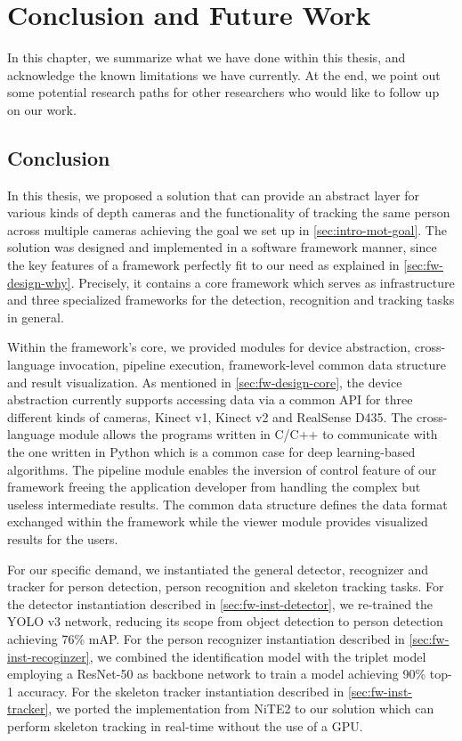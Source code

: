 \chapter{Conclusion and Future Work}
\label{chap:Conclusion}

In this chapter, we summarize what we have done within this
thesis, and acknowledge the known limitations we have currently.
At the end, we point out some potential research paths for other
researchers who would like to follow up on our work.


\section{Conclusion}
\label{sec:Conclusion-summary}

In this thesis, we proposed a solution that can provide an abstract
layer for various kinds of depth cameras and the functionality of tracking
the same person across multiple cameras achieving the goal we set up in 
\autoref{sec:intro-mot-goal}.
The solution was designed and implemented in a software framework manner, 
since the key features of a framework perfectly fit to our need as explained
in \autoref{sec:fw-design-why}.
Precisely, it contains a core framework which serves as infrastructure and three 
specialized frameworks for the detection, recognition and tracking tasks in general.

Within the framework's core, we provided modules for device abstraction,
cross-language invocation, pipeline execution, framework-level common
data structure and result visualization.
As mentioned in \autoref{sec:fw-design-core}, the device abstraction currently
supports accessing data via a common API for three different kinds of 
cameras, Kinect v1, Kinect v2 and RealSense D435. The cross-language module 
allows the programs written in C/C++ to communicate with the one written in
Python which is a common case for deep learning-based algorithms.
The pipeline module enables the inversion of control feature of our framework
freeing the application developer from handling the complex but useless 
intermediate results. The common data structure defines the data format 
exchanged within the framework while the viewer module provides visualized
results for the users.

For our specific demand, we instantiated the general detector, recognizer 
and tracker for person detection, person recognition and skeleton tracking
tasks.
For the detector instantiation described in \autoref{sec:fw-inst-detector}, 
we re-trained the YOLO v3 network, reducing its
scope from object detection to person detection achieving 76\% mAP. 
For the person recognizer instantiation described in
\autoref{sec:fw-inst-recoginzer}, we combined the identification model with the 
triplet model employing a ResNet-50 as backbone network to train a model 
achieving 90\% top-1 accuracy.
For the skeleton tracker instantiation described in \autoref{sec:fw-inst-tracker},
we ported the implementation from NiTE2 to our solution which can perform
skeleton tracking in real-time without the use of a GPU.

